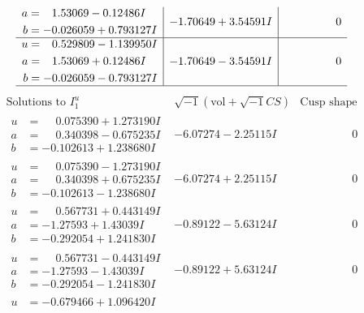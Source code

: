 \documentclass[1p]{elsarticle_modified}
\theoremstyle{definition}
\newcommand{\I}{\sqrt{-1}}
\begin{document}
$$\begin{array}{c|c|c}
\begin{aligned}
a &= \phantom{-}1.53069 - 0.12486 I \\
b &= -0.026059 + 0.793127 I\end{aligned}
 & -1.70649 + 3.54591 I & \phantom{-0.000000 } 0 \\ \hline\begin{aligned}
u &= \phantom{-}0.529809 - 1.139950 I \\
a &= \phantom{-}1.53069 + 0.12486 I \\
b &= -0.026059 - 0.793127 I\end{aligned}
 & -1.70649 - 3.54591 I & \phantom{-0.000000 } 0\\
 \hline 
 \end{array}$$\newpage$$\begin{array}{c|c|c}  
\text{Solutions to }I^u_{1}& \I (\text{vol} + \sqrt{-1}CS) & \text{Cusp shape}\\
 \hline 
\begin{aligned}
u &= \phantom{-}0.075390 + 1.273190 I \\
a &= \phantom{-}0.340398 - 0.675235 I \\
b &= -0.102613 + 1.238680 I\end{aligned}
 & -6.07274 - 2.25115 I & \phantom{-0.000000 } 0 \\ \hline\begin{aligned}
u &= \phantom{-}0.075390 - 1.273190 I \\
a &= \phantom{-}0.340398 + 0.675235 I \\
b &= -0.102613 - 1.238680 I\end{aligned}
 & -6.07274 + 2.25115 I & \phantom{-0.000000 } 0 \\ \hline\begin{aligned}
u &= \phantom{-}0.567731 + 0.443149 I \\
a &= -1.27593 + 1.43039 I \\
b &= -0.292054 + 1.241830 I\end{aligned}
 & -0.89122 - 5.63124 I & \phantom{-0.000000 } 0 \\ \hline\begin{aligned}
u &= \phantom{-}0.567731 - 0.443149 I \\
a &= -1.27593 - 1.43039 I \\
b &= -0.292054 - 1.241830 I\end{aligned}
 & -0.89122 + 5.63124 I & \phantom{-0.000000 } 0 \\ \hline\begin{aligned}
u &= -0.679466 + 1.096420 I \\

\end{aligned}
\end{array}$$
\end{document}
